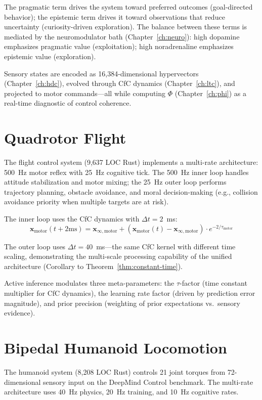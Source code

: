 \documentclass[12pt]{book}
\newcommand{\hvx}{\mathbf{x}}
\begin{document}
The pragmatic term drives the system toward preferred outcomes (goal-directed behavior); the epistemic term drives it toward observations that reduce uncertainty (curiosity-driven exploration). The balance between these terms is mediated by the neuromodulator bath (Chapter~\ref{ch:neuro}): high dopamine emphasizes pragmatic value (exploitation); high noradrenaline emphasizes epistemic value (exploration).

Sensory states are encoded as 16,384-dimensional hypervectors (Chapter~\ref{ch:hdc}), evolved through CfC dynamics (Chapter~\ref{ch:ltc}), and projected to motor commands---all while computing $\Phi$ (Chapter~\ref{ch:phi}) as a real-time diagnostic of control coherence.

\section{Quadrotor Flight}

The flight control system (9,637 LOC Rust) implements a multi-rate architecture: 500~Hz motor reflex with 25~Hz cognitive tick. The 500~Hz inner loop handles attitude stabilization and motor mixing; the 25~Hz outer loop performs trajectory planning, obstacle avoidance, and moral decision-making (e.g., collision avoidance priority when multiple targets are at risk).

The inner loop uses the CfC dynamics with $\Delta t = 2$~ms:
\begin{equation}
\hvx_{\text{motor}}(t + 2\text{ms}) = \mathbf{x}_{\infty,\text{motor}} + (\hvx_{\text{motor}}(t) - \mathbf{x}_{\infty,\text{motor}}) \cdot e^{-2/\tau_{\text{motor}}}
\end{equation}

The outer loop uses $\Delta t = 40$~ms---the same CfC kernel with different time scaling, demonstrating the multi-scale processing capability of the unified architecture (Corollary to Theorem~\ref{thm:constant-time}).

Active inference modulates three meta-parameters: the $\tau$-factor (time constant multiplier for CfC dynamics), the learning rate factor (driven by prediction error magnitude), and prior precision (weighting of prior expectations vs.\ sensory evidence).

\section{Bipedal Humanoid Locomotion}

The humanoid system (8,208 LOC Rust) controls 21 joint torques from 72-dimensional sensory input on the DeepMind Control benchmark. The multi-rate architecture uses 40~Hz physics, 20~Hz training, and 10~Hz cognitive rates.
\end{document}
